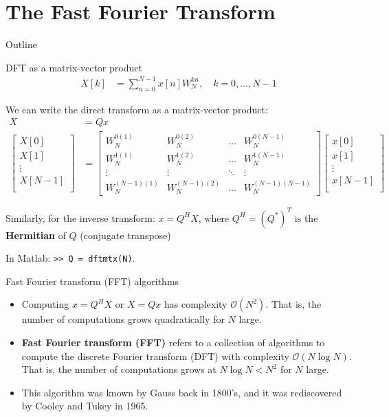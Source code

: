 \documentclass[10pt]{beamer}
\begin{document}
%
\section{The Fast Fourier Transform}
\begin{frame}{Outline}
	\tableofcontents[currentsection]
\end{frame}

\begin{frame}{DFT as a matrix-vector product}
\begin{align}
X[k] &= \sum_{n = 0}^{N-1}x[n]W_N^{kn}, \quad k = 0, \ldots, N-1 \tag{direct transform}
\end{align}

We can write the direct transform as a matrix-vector product:
\begin{align*}
X &= Qx \\
\begin{bmatrix}
X[0] \\
X[1] \\
\vdots \\
X[N-1] \\
\end{bmatrix} &= \begin{bmatrix}
W_N^{0(1)} & W_N^{0(2)} & \ldots & W_N^{0(N-1)} \\
W_N^{1(1)} & W_N^{1(2)} & \ldots & W_N^{1(N-1)} \\
\vdots & \vdots & \ddots & \vdots \\
W_N^{(N-1)(1)} & W_N^{(N-1)(2)} & \ldots & W_N^{(N-1)(N-1)}
\end{bmatrix}\begin{bmatrix}
x[0] \\
x[1] \\
\vdots \\
x[N-1] \\
\end{bmatrix}
\end{align*}

Similarly, for the inverse transform: $x = Q^HX$, where $Q^H = (Q^*)^T$ is the \textbf{Hermitian} of $Q$ (conjugate transpose)

\vspace{0.25cm}
In Matlab: \texttt{>> Q = dftmtx(N)}.
\end{frame}

%
\begin{frame}{Fast Fourier transform (FFT) algorithms}
\begin{itemize}
	\item Computing $x = Q^HX$ or $X = Qx$ has complexity $\mathcal{O}(N^2)$. That is, the number of computations grows quadratically for $N$ large.
	\item \textbf{Fast Fourier transform (FFT)} refers to a collection of algorithms to compute the discrete Fourier transform (DFT) with complexity $\mathcal{O}(N\log N)$. That is, the number of computations grows at $N\log N < N^2$ for $N$ large.
	\item This algorithm was known by Gauss back in 1800's, and it was rediscovered by Cooley and Tukey in 1965.
\end{itemize}
\end{frame}
\end{document}

